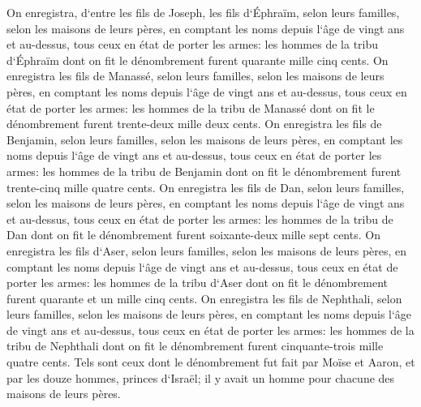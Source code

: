 \verse On enregistra, d`entre les fils de Joseph, les fils d`Éphraïm, selon leurs familles, selon les maisons de leurs pères, en comptant les noms depuis l`âge de vingt ans et au-dessus, tous ceux en état de porter les armes: 
\verse les hommes de la tribu d`Éphraïm dont on fit le dénombrement furent quarante mille cinq cents. 
\verse On enregistra les fils de Manassé, selon leurs familles, selon les maisons de leurs pères, en comptant les noms depuis l`âge de vingt ans et au-dessus, tous ceux en état de porter les armes: 
\verse les hommes de la tribu de Manassé dont on fit le dénombrement furent trente-deux mille deux cents. 
\verse On enregistra les fils de Benjamin, selon leurs familles, selon les maisons de leurs pères, en comptant les noms depuis l`âge de vingt ans et au-dessus, tous ceux en état de porter les armes: 
\verse les hommes de la tribu de Benjamin dont on fit le dénombrement furent trente-cinq mille quatre cents. 
\verse On enregistra les fils de Dan, selon leurs familles, selon les maisons de leurs pères, en comptant les noms depuis l`âge de vingt ans et au-dessus, tous ceux en état de porter les armes: 
\verse les hommes de la tribu de Dan dont on fit le dénombrement furent soixante-deux mille sept cents. 
\verse On enregistra les fils d`Aser, selon leurs familles, selon les maisons de leurs pères, en comptant les noms depuis l`âge de vingt ans et au-dessus, tous ceux en état de porter les armes: 
\verse les hommes de la tribu d`Aser dont on fit le dénombrement furent quarante et un mille cinq cents. 
\verse On enregistra les fils de Nephthali, selon leurs familles, selon les maisons de leurs pères, en comptant les noms depuis l`âge de vingt ans et au-dessus, tous ceux en état de porter les armes: 
\verse les hommes de la tribu de Nephthali dont on fit le dénombrement furent cinquante-trois mille quatre cents. 
\verse Tels sont ceux dont le dénombrement fut fait par Moïse et Aaron, et par les douze hommes, princes d`Israël; il y avait un homme pour chacune des maisons de leurs pères. 
